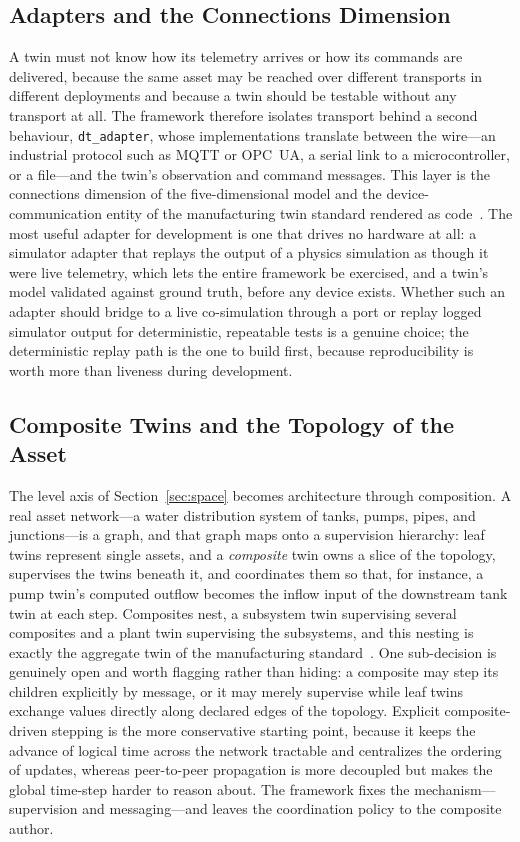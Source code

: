 \documentclass[conference]{IEEEtran}
\begin{document}
\subsection{Adapters and the Connections Dimension}
A twin must not know how its telemetry arrives or how its commands are
delivered, because the same asset may be reached over different transports in
different deployments and because a twin should be testable without any
transport at all. The framework therefore isolates transport behind a second
behaviour, \texttt{dt\_adapter}, whose implementations translate between the
wire---an industrial protocol such as MQTT or OPC~UA, a serial link to a
microcontroller, or a file---and the twin's observation and command messages.
This layer is the connections dimension of the five-dimensional model and the
device-communication entity of the manufacturing twin standard rendered as
code~\cite{tao2019,iso23247}. The most useful adapter for development is one
that drives no hardware at all: a simulator adapter that replays the output of a
physics simulation as though it were live telemetry, which lets the entire
framework be exercised, and a twin's model validated against ground truth,
before any device exists. Whether such an adapter should bridge to a live
co-simulation through a port or replay logged simulator output for
deterministic, repeatable tests is a genuine choice; the deterministic
replay path is the one to build first, because reproducibility is worth more
than liveness during development.

\subsection{Composite Twins and the Topology of the Asset}
The level axis of Section~\ref{sec:space} becomes architecture through
composition. A real asset network---a water distribution system of tanks,
pumps, pipes, and junctions---is a graph, and that graph maps onto a supervision
hierarchy: leaf twins represent single assets, and a \emph{composite} twin owns
a slice of the topology, supervises the twins beneath it, and coordinates them
so that, for instance, a pump twin's computed outflow becomes the inflow input
of the downstream tank twin at each step. Composites nest, a subsystem twin
supervising several composites and a plant twin supervising the subsystems, and
this nesting is exactly the aggregate twin of the manufacturing
standard~\cite{iso23247}. One sub-decision is genuinely open and worth flagging
rather than hiding: a composite may step its children explicitly by message, or
it may merely supervise while leaf twins exchange values directly along declared
edges of the topology. Explicit composite-driven stepping is the more
conservative starting point, because it keeps the advance of logical time
across the network tractable and centralizes the ordering of updates, whereas
peer-to-peer propagation is more decoupled but makes the global time-step harder
to reason about. The framework fixes the mechanism---supervision and
messaging---and leaves the coordination policy to the composite author.
\end{document}
